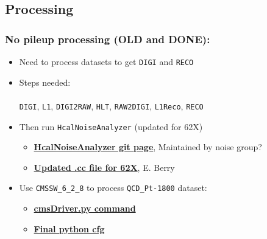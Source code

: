 \documentclass[bigger]{beamer}
\providecommand{\alert}[1]{\textbf{#1}}
\begin{document}
\subsection{Processing}
\label{sec-2-2}
\begin{frame}
\frametitle{No pileup processing (OLD and DONE):}
\label{sec-2-2-1}
\begin{itemize}

\item Need to process datasets to get \texttt{DIGI} and \texttt{RECO}
\label{sec-2-2-1-1}%

\item Steps needed: \\\\
\label{sec-2-2-1-2}%
\texttt{DIGI}, \texttt{L1}, \texttt{DIGI2RAW}, \texttt{HLT}, \texttt{RAW2DIGI}, \texttt{L1Reco}, \texttt{RECO}

\item Then run \texttt{HcalNoiseAnalyzer} (updated for 62X)
\label{sec-2-2-1-3}%
\begin{itemize}

\item \href{https://github.com/FHead/HcalNoiseAnalyzerCMS}{\alert{HcalNoiseAnalyzer git page}}, Maintained by noise group?
\label{sec-2-2-1-3-1}%

\item \href{http://eberry.web.cern.ch/eberry/HcalNoiseAnalyzer62X.cc.txt}{\alert{Updated .cc file for 62X}}, E. Berry
\label{sec-2-2-1-3-2}%
\end{itemize} %

\item Use \texttt{CMSSW\_6\_2\_8} to process \texttt{QCD\_Pt-1800} dataset:
\label{sec-2-2-1-4}%
\begin{itemize}

\item \href{https://raw.githubusercontent.com/edmundaberry/HcalReco/master/test/hcalNoise_fromGEN-SIM_62X_cmsDriver.sh}{\alert{cmsDriver.py command}}
\label{sec-2-2-1-4-1}%

\item \href{https://raw.githubusercontent.com/edmundaberry/HcalReco/master/test/hcalNoise\_fromGEN-SIM\_62X\_cfg.py}{\alert{Final python cfg}}
\label{sec-2-2-1-4-2}%
\end{itemize} %
\end{itemize} %
\end{frame}
\end{document}
